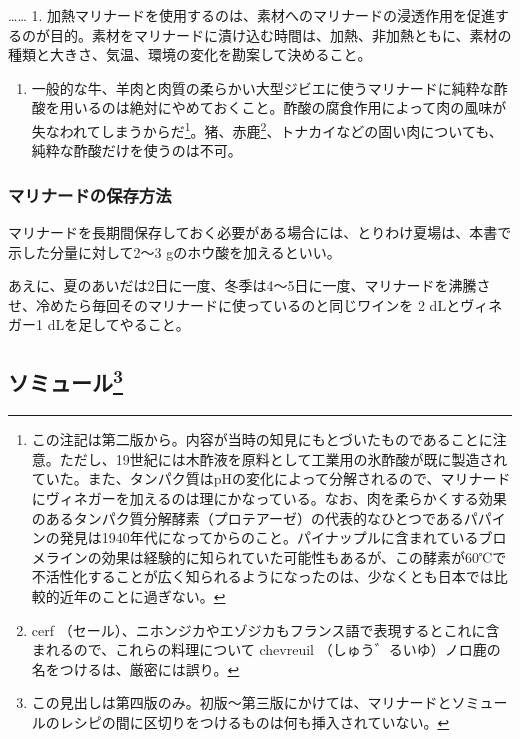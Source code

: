 \begin{recette}
\ldots{}\ldots{} 1.
加熱マリナードを使用するのは、素材へのマリナードの浸透作用を促進するのが目的。素材をマリナードに漬け込む時間は、加熱、非加熱ともに、素材の種類と大きさ、気温、環境の変化を勘案して決めること。

\begin{enumerate}
\def\labelenumi{\arabic{enumi}.}
\setcounter{enumi}{1}
\tightlist
\item
  一般的な牛、羊肉と肉質の柔らかい大型ジビエに使うマリナードに純粋な酢酸を用いるのは絶対にやめておくこと。酢酸の腐食作用によって肉の風味が失なわれてしまうからだ\footnote{この注記は第二版から。内容が当時の知見にもとづいたものであることに注意。ただし、19世紀には木酢液を原料として工業用の氷酢酸が既に製造されていた。また、タンパク質はpHの変化によって分解されるので、マリナードにヴィネガーを加えるのは理にかなっている。なお、肉を柔らかくする効果のあるタンパク質分解酵素（プロテアーゼ）の代表的なひとつであるパパインの発見は1940年代になってからのこと。パイナップルに含まれているブロメラインの効果は経験的に知られていた可能性もあるが、この酵素が60℃で不活性化することが広く知られるようになったのは、少なくとも日本では比較的近年のことに過ぎない。}。猪、赤鹿\footnote{cerf
    （セール）、ニホンジカやエゾジカもフランス語で表現するとこれに含まれるので、これらの料理について
    chevreuil （しゅう゛るいゆ）ノロ鹿の名をつけるは、厳密には誤り。}、トナカイなどの固い肉についても、純粋な酢酸だけを使うのは不可。
\end{enumerate}

\hypertarget{conservation-des-marinades}{%
\subsubsection{マリナードの保存方法}\label{conservation-des-marinades}}



マリナードを長期間保存しておく必要がある場合には、とりわけ夏場は、本書で示した分量に対して2〜3
gのホウ酸を加えるといい。

あえに、夏のあいだは2日に一度、冬季は4〜5日に一度、マリナードを沸騰させ、冷めたら毎回そのマリナードに使っているのと同じワインを
2 dLとヴィネガー1 dLを足してやること。
\end{recette}
\hypertarget{saumures}{%
\subsection[ソミュール]{\texorpdfstring{ソミュール\footnote{この見出しは第四版のみ。初版〜第三版にかけては、マリナードとソミュールのレシピの間に区切りをつけるものは何も挿入されていない。}}{ソミュール}}\label{saumures}}

